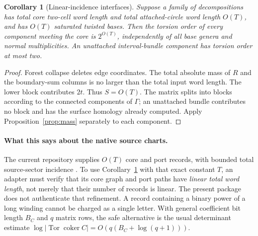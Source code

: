 \documentclass[11pt]{article}
\newtheorem{corollary}[theorem]{Corollary}
\theoremstyle{definition}
\theoremstyle{remark}
\newcommand{\coker}{\operatorname{coker}}
\newcommand{\Tor}{\operatorname{Tor}}
\begin{document}
\begin{corollary}[Linear-incidence interfaces]
\label{cor:linear-incidence}
Suppose a family of decompositions has total core two-cell word length and
total attached-circle word length $O(T)$, and has $O(T)$ saturated twisted
bases. Then the torsion order of every component meeting the core is
$2^{O(T)}$, independently of all base genera and normal multiplicities.
An unattached interval-bundle component has torsion order at most two.
\end{corollary}
\begin{proof}
Forest collapse deletes edge coordinates. The total absolute mass of $R$
and the boundary-sum columns is no larger than the total input word length.
The lower block contributes $2t$. Thus $S=O(T)$. The matrix splits into
blocks according to the connected components of $\Gamma$; an unattached
bundle contributes no block and has the surface homology already computed.
Apply Proposition~\ref{prop:mass} separately to each component.
\end{proof}

\paragraph{What this says about the native source charts.}
The current repository supplies $O(T)$ core and port records, with bounded
total source-sector incidence \cite{repo-parallelity}. To use
Corollary~\ref{cor:linear-incidence} with that exact constant $T$, an adapter
must verify that its core graph and port paths have \emph{linear total word
length}, not merely that their number of records is linear. The present
package does not authenticate that refinement. A record containing a binary
power of a long winding cannot be charged as a single letter. With general
coefficient bit length $B_C$ and $q$ matrix rows, the safe alternative is the
usual determinant estimate $\log|\Tor\coker C|=O(q(B_C+\log(q+1)))$.
\end{document}
